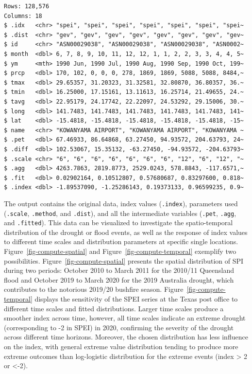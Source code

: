 \documentclass[
]{interact}
\begin{document}
\begin{verbatim}
Rows: 128,576
Columns: 18
$ .idx   <chr> "spei", "spei", "spei", "spei", "spei", "spei", "spei~
$ .dist  <chr> "gev", "gev", "gev", "gev", "gev", "gev", "gev", "gev~
$ id     <chr> "ASN00029038", "ASN00029038", "ASN00029038", "ASN0002~
$ month  <dbl> 6, 7, 8, 9, 10, 11, 12, 12, 1, 1, 2, 2, 3, 3, 4, 4, 5~
$ ym     <mth> 1990 Jun, 1990 Jul, 1990 Aug, 1990 Sep, 1990 Oct, 199~
$ prcp   <dbl> 170, 102, 0, 0, 0, 278, 1869, 1869, 5088, 5088, 8484,~
$ tmax   <dbl> 29.65357, 31.20323, 31.32581, 32.80870, 36.80357, 36.~
$ tmin   <dbl> 16.25000, 17.15161, 13.11613, 16.25714, 21.49655, 24.~
$ tavg   <dbl> 22.95179, 24.17742, 22.22097, 24.53292, 29.15006, 30.~
$ long   <dbl> 141.7483, 141.7483, 141.7483, 141.7483, 141.7483, 141~
$ lat    <dbl> -15.4818, -15.4818, -15.4818, -15.4818, -15.4818, -15~
$ name   <chr> "KOWANYAMA AIRPORT", "KOWANYAMA AIRPORT", "KOWANYAMA ~
$ .pet   <dbl> 67.46933, 86.64868, 63.27450, 94.93572, 204.63793, 24~
$ .diff  <dbl> 102.53067, 15.35132, -63.27450, -94.93572, -204.63793~
$ .scale <chr> "6", "6", "6", "6", "6", "6", "6", "12", "6", "12", "~
$ .agg   <dbl> 4263.7863, 2819.8773, 2529.0243, 578.8843, -117.6571,~
$ .fit   <dbl> 0.02902164, 0.10512807, 0.57680687, 0.83297600, 0.818~
$ .index <dbl> -1.89537090, -1.25286143, 0.19373133, 0.96599235, 0.9~
\end{verbatim}

The output contains the original data, index values (\texttt{.index}),
parameters used (\texttt{.scale}, \texttt{.method}, and \texttt{.dist}),
and all the intermediate variables (\texttt{.pet}, \texttt{.agg}, and
\texttt{.fitted}). This data can be visualized to investigate the
spatio-temporal distribution of the drought or flood events, as well as
the response of index values to different time scales and distribution
parameters at specific single locations.
Figure~\ref{fig-compute-spatial} and Figure~\ref{fig-compute-temporal}
exemplify two possibilities. Figure~\ref{fig-compute-spatial} presents
the spatial distribution of SPI during two periods: October 2010 to
March 2011 for the 2010/11 Queensland flood and October 2019 to March
2020 for the 2019 Australia drought, which contributes to the notorious
2019/20 bushfire season. Figure~\ref{fig-compute-temporal} displays the
sensitivity of the SPEI series at the Texas post office to different
time scales and fitted distributions. Larger time scales produce a
smoother index across time, however, all time scales indicate an extreme
drought (corresponding to -2 in SPEI) in 2020, confirming the severity
of the drought across different time horizons. Moreover, the chosen
distribution has less influence on the index, with general extreme value
distribution tending to produce more extreme outcomes than log-logistic
distribution for the extreme events (index \textgreater{} 2 or
\textless-2).
\end{document}
